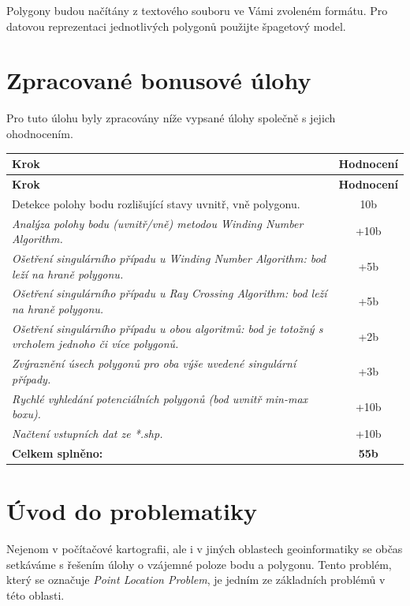 \documentclass[12pt, a4paper]{article}
\begin{document}
Polygony budou načítány z textového souboru ve Vámi zvoleném formátu. Pro datovou reprezentaci jednotlivých polygonů použijte špagetový model.

\section{Zpracované bonusové úlohy}

Pro tuto úlohu byly zpracovány níže vypsané úlohy společně s jejich ohodnocením.

\begin{small}
\begin{longtable}{|p{12cm}|c|}
    \hline
    \textbf{Krok} & \textbf{Hodnocení} \\
    \hline
    \endfirsthead
    
    \hline
    \textbf{Krok} & \textbf{Hodnocení} \\
    \hline
    \endhead

    Detekce polohy bodu rozlišující stavy uvnitř, vně polygonu. & 10b \\
    \hline
    \textit{Analýza polohy bodu (uvnitř/vně) metodou Winding Number Algorithm.} & +10b \\
    \hline
    \textit{Ošetření singulárního případu u Winding Number Algorithm: bod leží na hraně polygonu.} & +5b \\
    \hline
    \textit{Ošetření singulárního případu u Ray Crossing Algorithm: bod leží na hraně polygonu.} & +5b \\
    \hline
    \textit{Ošetření singulárního případu u obou algoritmů: bod je totožný s vrcholem jednoho či více polygonů.} & +2b \\
    \hline
    \textit{Zvýraznění úsech polygonů pro oba výše uvedené singulární případy.} & +3b \\
    \hline
    \textit{Rychlé vyhledání potenciálních polygonů (bod uvnitř min-max boxu).} & +10b \\
    \hline
    \textit{Načtení vstupních dat ze *.shp.} & +10b \\
    \hline
    \textbf{Celkem splněno:} & \textbf{55b} \\
    \hline
\end{longtable}
\end{small}

\section{Úvod do problematiky}
Nejenom v počítačové kartografii, ale i v jiných oblastech geoinformatiky se občas setkáváme s řešením úlohy o vzájemné poloze bodu a polygonu. Tento problém, který se označuje \textit{Point Location Problem}, je jedním ze základních problémů v této oblasti.
\end{document}
